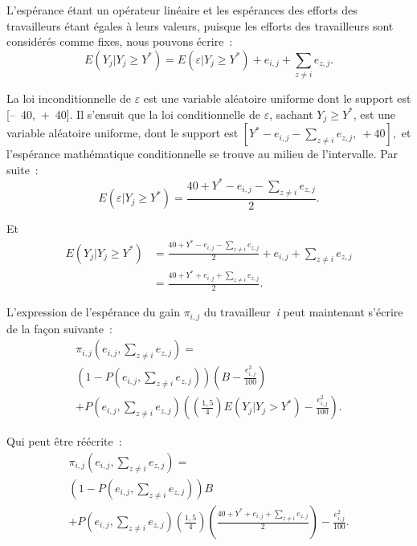 \begin{Article}
\begin{refsection}[Lebourges]
\begin{appendices}
L'espérance étant un opérateur linéaire et les espérances des efforts
des travailleurs étant égales à leurs valeurs, puisque les efforts des
travailleurs sont considérés comme fixes, nous pouvons écrire~:
\begin{equation}
    E\left( Y_{j}|Y_{j} \geq Y^{*} \right) = E\left( \varepsilon|Y_{j} \geq Y^{*} \right) + e_{i,j} + \sum_{z \neq i}^{}e_{z,j}.
\end{equation}

La loi inconditionnelle de $\varepsilon$ est une variable aléatoire uniforme
dont le support est [--~40,~+~40]. Il s'ensuit que la loi
conditionnelle de $\varepsilon$, sachant \(Y_{j} \geq Y^{*}\), est une
variable aléatoire uniforme, dont le support est
\(\left\lbrack Y^{*} - e_{i,j} - \sum_{z \neq i}^{}e_{z,j},\  + 40 \right\rbrack,\)
et l'espérance mathématique conditionnelle se trouve au milieu de
l'intervalle. Par suite~:
\begin{equation}
    E\left( \varepsilon|Y_{j} \geq Y^{*} \right) = \frac{40 + Y^{*} - e_{i,j} - \sum_{z \neq i}^{}e_{z,j}}{2}.
\end{equation}

Et
\begin{align}
E\left( Y_{j}|Y_{j} \geq Y^{*} \right) &= \frac{40 + Y^{*} - e_{i,j} - \sum_{z \neq i}^{}e_{z,j}}{2} + e_{i,j} + \sum_{z \neq i}^{}e_{z,j} \nonumber \\
 &= \frac{40 + Y^{*} + e_{i,j} + \sum_{z \neq i}^{}e_{z,j}}{2}.
\end{align}

L'expression de l'espérance du gain $\pi_{i,j}$ du travailleur~\emph{i} peut maintenant s'écrire de la façon suivante~:
\begin{multline}
\pi_{i,j}\left( e_{i,j},\sum_{z \neq i}^{}e_{z,j} \right) = \\
    \left( 1 - P\left( e_{i,j},\sum_{z \neq i}^{}e_{z,j} \right) \right)\left( B - \frac{e_{i,j}^{2}}{100} \right) \\
    + P\left( e_{i,j},\sum_{z \neq i}^{}e_{z,j} \right)\left( \left( \frac{1,5}{4} \right)E\left( Y_{j}|Y_{j} > Y^{*} \right) - \frac{e_{i,j}^{2}}{100} \right).
\end{multline}

Qui peut être réécrite~:
\begin{multline}
\pi_{i,j}\left( e_{i,j},\sum_{z \neq i}^{}e_{z,j} \right) = \\
\left( 1 - P\left( e_{i,j},\sum_{z \neq i}^{}e_{z,j} \right) \right)B \\
+ P\left( e_{i,j},\sum_{z \neq i}^{}e_{z,j} \right)\left( \frac{1,5}{4} \right)\left( \frac{40 + Y^{*} + e_{i,j} + \sum_{z \neq i}^{}e_{z,j}}{2} \right) - \frac{e_{i,j}^{2}}{100}.
\end{multline}


\end{appendices}
\end{refsection}
\end{Article}
